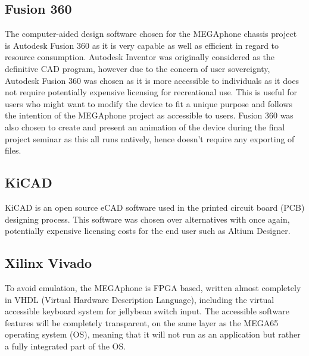 
\subsection{Fusion 360}

The computer-aided design software chosen for the MEGAphone chassis project is Autodesk Fusion 360 as it is very capable as well as efficient in regard to resource consumption. 
Autodesk Inventor was originally considered as the definitive CAD program, however due to the concern of user sovereignty, Autodesk Fusion 360 was chosen as it is more accessible to individuals as it does not require potentially expensive licensing for recreational use. 
This is useful for users who might want to modify the device to fit a unique purpose and follows the intention of the MEGAphone project as accessible to users.
Fusion 360 was also chosen to create and present an animation of the device during the final project seminar as this all runs natively, hence doesn't require any exporting of files.


\subsection{KiCAD}

KiCAD is an open source eCAD software used in the printed circuit board (PCB) designing process.
This software was chosen over alternatives with once again, potentially expensive licensing costs for the end user such as Altium Designer.



\subsection{Xilinx Vivado}

To avoid emulation, the MEGAphone is FPGA based, written almost completely in VHDL (Virtual Hardware Description Language), including the virtual accessible keyboard system for jellybean switch input.
The accessible software features will be completely transparent, on the same layer as the MEGA65 operating system (OS), meaning that it will not run as an application but rather a fully integrated part of the OS.

